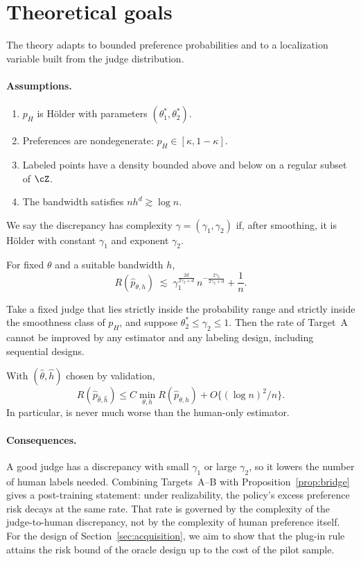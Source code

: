 \section{Theoretical goals}
\label{sec:theory}

The theory adapts \citet{li2026personalizing} to bounded preference probabilities and to a
localization variable built from the judge distribution.

\paragraph{Assumptions.}
\begin{enumerate}[label=(\roman*)]
  \item $p_H$ is H\"older with parameters $(\theta_1^{*},\theta_2^{*})$.
  \item Preferences are nondegenerate: $p_H\in[\kappa,1-\kappa]$.
  \item Labeled points have a density bounded above and below on a regular subset of $\cZ$.
  \item The bandwidth satisfies $nh^d\gtrsim\log n$.
\end{enumerate}
We say the discrepancy has complexity $\gamma=(\gamma_1,\gamma_2)$ if, after smoothing, it is
H\"older with constant $\gamma_1$ and exponent $\gamma_2$.

\begin{target}
For fixed $\theta$ and a suitable bandwidth $h$,
\[
  R(\hat p_{\theta,h})\;\lesssim\;\gamma_1^{\frac{2d}{2\gamma_2+d}}\,
  n^{-\frac{2\gamma_2}{2\gamma_2+d}}+\frac1n .
\]
\end{target}

\begin{target}
Take a fixed judge that lies strictly inside the probability range and strictly inside the
smoothness class of $p_H$, and suppose $\theta_2^{*}\le\gamma_2\le1$. Then the rate of Target~A
cannot be improved by any estimator and any labeling design, including sequential designs.
\end{target}

\begin{target}
With $(\hat\theta,\hat h)$ chosen by validation,
\[
  R(\hat p_{\hat\theta,\hat h})\le C\min_{\theta,h}R(\hat p_{\theta,h})+O\{(\log n)^2/n\}.
\]
In particular, \dfsp{} is never much worse than the human-only estimator.
\end{target}

\paragraph{Consequences.}
A good judge has a discrepancy with small $\gamma_1$ or large $\gamma_2$, so it lowers the number of
human labels needed. Combining Targets~A--B with Proposition~\ref{prop:bridge} gives a post-training
statement: under realizability, the policy's excess preference risk decays at the same rate. That
rate is governed by the complexity of the judge-to-human discrepancy, not by the complexity of
human preference itself. For the design of Section~\ref{sec:acquisition}, we aim to show that the
plug-in rule attains the risk bound of the oracle design up to the cost of the pilot sample.
